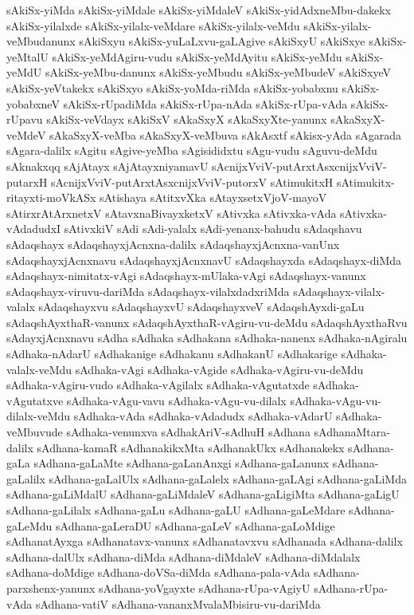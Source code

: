 {sAkiSx-yiMda
sAkiSx-yiMdale
sAkiSx-yiMdaleV
sAkiSx-yidAdxneMbu-dakekx
sAkiSx-yilalxde
sAkiSx-yilalx-veMdare
sAkiSx-yilalx-veMdu
sAkiSx-yilalx-veMbudanunx
sAkiSxyu
sAkiSx-yuLaLxvu-gaLAgive
sAkiSxyU
sAkiSxye
sAkiSx-yeMtalU
sAkiSx-yeMdAgiru-vudu
sAkiSx-yeMdAyitu
sAkiSx-yeMdu
sAkiSx-yeMdU
sAkiSx-yeMbu-danunx
sAkiSx-yeMbudu
sAkiSx-yeMbudeV
sAkiSxyeV
sAkiSx-yeVtakekx
sAkiSxyo
sAkiSx-yoMda-riMda
sAkiSx-yobabxnu
sAkiSx-yobabxneV
sAkiSx-rUpadiMda
sAkiSx-rUpa-nAda
sAkiSx-rUpa-vAda
sAkiSx-rUpavu
sAkiSx-veVdayx
sAkiSxV
sAkaSxyX
sAkaSxyXte-yanunx
sAkaSxyX-veMdeV
sAkaSxyX-veMba
sAkaSxyX-veMbuva
sAkAsxtf
sAkisx-yAda
sAgarada
sAgara-dalilx
sAgitu
sAgive-yeMba
sAgisididxtu
sAgu-vudu
sAguvu-deMdu
sAknakxqq
sAjAtayx
sAjAtayxniyamavU
sAcnijxVviV-putArxtAsxcnijxVviV-putarxH
sAcnijxVviV-putArxtAsxcnijxVviV-putorxV
sAtimukitxH
sAtimukitx-ritayxti-moVkASx
sAtishaya
sAtitxvXka
sAtayxsetxVjoV-mayoV
sAtirxrAtArxnetxV
sAtavxnaBivayxketxV
sAtivxka
sAtivxka-vAda
sAtivxka-vAdadudxI
sAtivxkiV
sAdi
sAdi-yalalx
sAdi-yenanx-bahudu
sAdaqshavu
sAdaqshayx
sAdaqshayxjAcnxna-dalilx
sAdaqshayxjAcnxna-vanUnx
sAdaqshayxjAcnxnavu
sAdaqshayxjAcnxnavU
sAdaqshayxda
sAdaqshayx-diMda
sAdaqshayx-nimitatx-vAgi
sAdaqshayx-mUlaka-vAgi
sAdaqshayx-vanunx
sAdaqshayx-viruvu-dariMda
sAdaqshayx-vilalxdadxriMda
sAdaqshayx-vilalx-valalx
sAdaqshayxvu
sAdaqshayxvU
sAdaqshayxveV
sAdaqshAyxdi-gaLu
sAdaqshAyxthaR-vanunx
sAdaqshAyxthaR-vAgiru-vu-deMdu
sAdaqshAyxthaRvu
sAdayxjAcnxnavu
sAdha
sAdhaka
sAdhakana
sAdhaka-nanenx
sAdhaka-nAgiralu
sAdhaka-nAdarU
sAdhakanige
sAdhakanu
sAdhakanU
sAdhakarige
sAdhaka-valalx-veMdu
sAdhaka-vAgi
sAdhaka-vAgide
sAdhaka-vAgiru-vu-deMdu
sAdhaka-vAgiru-vudo
sAdhaka-vAgilalx
sAdhaka-vAgutatxde
sAdhaka-vAgutatxve
sAdhaka-vAgu-vavu
sAdhaka-vAgu-vu-dilalx
sAdhaka-vAgu-vu-dilalx-veMdu
sAdhaka-vAda
sAdhaka-vAdadudx
sAdhaka-vAdarU
sAdhaka-veMbuvude
sAdhaka-venunxva
sAdhakAriV-sAdhuH
sAdhana
sAdhanaMtara-dalilx
sAdhana-kamaR
sAdhanakikxMta
sAdhanakUkx
sAdhanakekx
sAdhana-gaLa
sAdhana-gaLaMte
sAdhana-gaLanAnxgi
sAdhana-gaLanunx
sAdhana-gaLalilx
sAdhana-gaLalUlx
sAdhana-gaLalelx
sAdhana-gaLAgi
sAdhana-gaLiMda
sAdhana-gaLiMdalU
sAdhana-gaLiMdaleV
sAdhana-gaLigiMta
sAdhana-gaLigU
sAdhana-gaLilalx
sAdhana-gaLu
sAdhana-gaLU
sAdhana-gaLeMdare
sAdhana-gaLeMdu
sAdhana-gaLeraDU
sAdhana-gaLeV
sAdhana-gaLoMdige
sAdhanatAyxga
sAdhanatavx-vanunx
sAdhanatavxvu
sAdhanada
sAdhana-dalilx
sAdhana-dalUlx
sAdhana-diMda
sAdhana-diMdaleV
sAdhana-diMdalalx
sAdhana-doMdige
sAdhana-doVSa-diMda
sAdhana-pala-vAda
sAdhana-parxshenx-yanunx
sAdhana-yoVgayxte
sAdhana-rUpa-vAgiyU
sAdhana-rUpa-vAda
sAdhana-vatiV
sAdhana-vananxMvalaMbisiru-vu-dariMda
}
